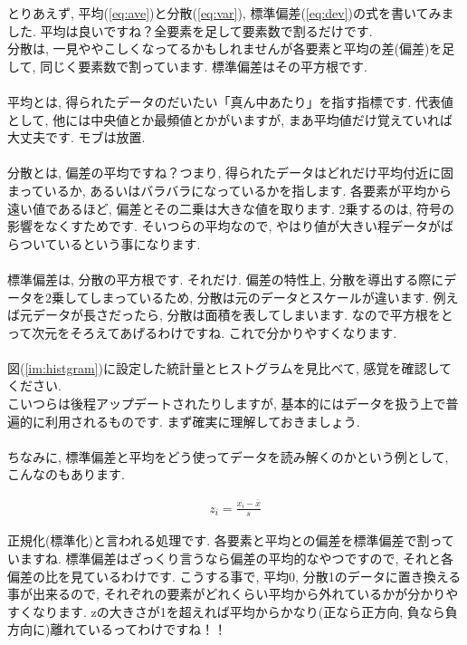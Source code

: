 \documentclass[11pt,a4paper]{jreport}
\begin{document}
とりあえず, 平均(\ref{eq:ave})と分散(\ref{eq:var}), 標準偏差(\ref{eq:dev})の式を書いてみました. 平均は良いですね？全要素を足して要素数で割るだけです.\\
分散は, 一見ややこしくなってるかもしれませんが各要素と平均の差(偏差)を足して, 同じく要素数で割っています. 標準偏差はその平方根です.\\
\\
平均とは, 得られたデータのだいたい「真ん中あたり」を指す指標です. 代表値として, 他には中央値とか最頻値とかがいますが, まあ平均値だけ覚えていれば大丈夫です. モブは放置.\\
\\
分散とは, 偏差の平均ですね？つまり, 得られたデータはどれだけ平均付近に固まっているか, あるいはバラバラになっているかを指します. 各要素が平均から遠い値であるほど, 偏差とその二乗は大きな値を取ります. 2乗するのは, 符号の影響をなくすためです. そいつらの平均なので, やはり値が大きい程データがばらついているという事になります.\\
\\
標準偏差は, 分散の平方根です. それだけ. 偏差の特性上, 分散を導出する際にデータを2乗してしまっているため, 分散は元のデータとスケールが違います. 例えば元データが長さだったら, 分散は面積を表してしまいます. なので平方根をとって次元をそろえてあげるわけですね. これで分かりやすくなります.\\
\\
図(\ref{im:histgram})に設定した統計量とヒストグラムを見比べて, 感覚を確認してください.
\\
こいつらは後程アップデートされたりしますが, 基本的にはデータを扱う上で普遍的に利用されるものです. まず確実に理解しておきましょう.\\
\\
ちなみに, 標準偏差と平均をどう使ってデータを読み解くのかという例として, こんなのもあります.

\begin{eqnarray}
z_i = \frac{x_i - \bar{x}}{s}
\end{eqnarray}

正規化(標準化)と言われる処理です. 各要素と平均との偏差を標準偏差で割っていますね. 標準偏差はざっくり言うなら偏差の平均的なやつですので, それと各偏差の比を見ているわけです. こうする事で, 平均0, 分散1のデータに置き換える事が出来るので, それぞれの要素がどれくらい平均から外れているかが分かりやすくなります. zの大きさが1を超えれば平均からかなり(正なら正方向, 負なら負方向に)離れているってわけですね！！\\
\end{document}
